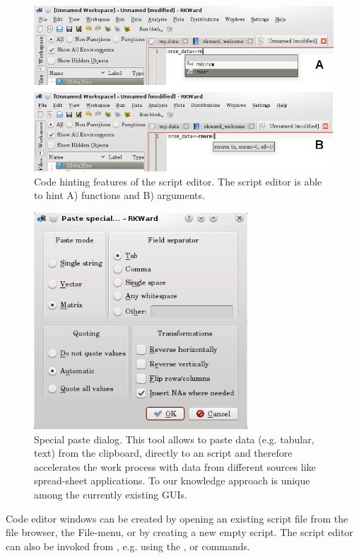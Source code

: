 \begin{figure}[htp]
 \centering
 \includegraphics{../figures/code_hinting.png}
 \caption{Code hinting features of the script editor. The script editor is able to hint A)  functions
and B) arguments.}
 \label{fig:code_hinting}
\end{figure}

\begin{figure}[htp]
 \centering
 \includegraphics[width=8cm]{../figures/special_paste.png}
 \caption{Special paste dialog. This tool allows to paste data (e.g. tabular, text) from the clipboard, directly to an 
 script and therefore accelerates the work process with data from different sources 
like spread-sheet applications. To our knowledge approach is unique among the currently existing  GUIs.}
 \label{fig:special_paste}
\end{figure}

Code editor windows can be created by opening an existing
 script file from the file browser, the
File-menu, or by creating a new empty script. The script editor can
also be invoked from , e.g. using the
,  or 
commands.

